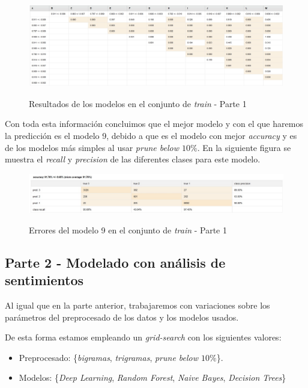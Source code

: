 \documentclass[es]{uc3mreport}
\begin{document}
\begin{report}
    \begin{figure}[H]
        \center
        \includegraphics[width=\linewidth]{t_test1.jpeg}\\ 
        \caption{Resultados de los modelos en el conjunto de \textit{train} - Parte 1}
    \end{figure}

    Con toda esta información concluimos que el mejor modelo y con el que haremos
    la predicción es el modelo 9, debido a que es el modelo con mejor
    \textit{accuracy} y es de los modelos más simples al usar \textit{prune below $10\%$}.
    En la siguiente figura se muestra el \textit{recall} y \textit{precision}
    de las diferentes clases para este modelo.

    \begin{figure}[H]
        \center
        \includegraphics[width=\linewidth]{train1.jpeg}\\ 
        \caption{Errores del modelo 9 en el conjunto de \textit{train} - Parte 1}
    \end{figure}

\subsection{Parte 2 - Modelado con análisis de sentimientos}
\label{sec:parte2}

    Al igual que en la parte anterior, trabajaremos con variaciones
    sobre los parámetros del preprocesado de los datos y los modelos usados.

    De esta forma estamos empleando un \textit{grid-search} con los siguientes valores:
    \begin{itemize}
        \item Preprocesado: \{\textit{bigramas}, \textit{trigramas}, \textit{prune below $10\%$}\}.
        \item Modelos: \{\textit{Deep Learning}, \textit{Random Forest}, \textit{Naive Bayes}, \textit{Decision Trees}\}
    \end{itemize}


\end{report}
\end{document}
